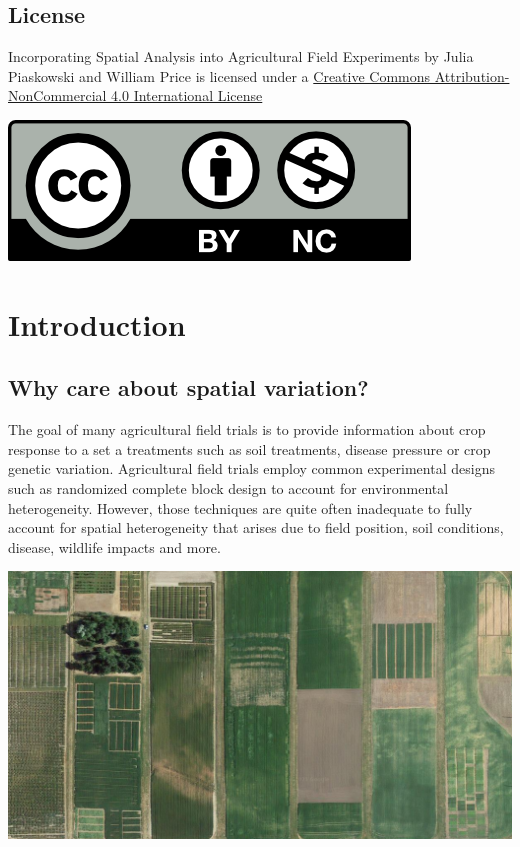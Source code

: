 \documentclass[
]{book}
\begin{document}
\hypertarget{license}{%
\section{License}\label{license}}

Incorporating Spatial Analysis into Agricultural Field Experiments by Julia Piaskowski and William Price is licensed under a \href{https://creativecommons.org/licenses/by-nc/4.0/}{Creative Commons Attribution-NonCommercial 4.0 International License}

\begin{center}\includegraphics[width=0.2\linewidth]{img/CC-by-nc} \end{center}

\hypertarget{intro}{%
\chapter{Introduction}\label{intro}}

\hypertarget{why-care-about-spatial-variation}{%
\section{Why care about spatial variation?}\label{why-care-about-spatial-variation}}

The goal of many agricultural field trials is to provide information about crop response to a set a treatments such as soil treatments, disease pressure or crop genetic variation. Agricultural field trials employ common experimental designs such as randomized complete block design to account for environmental heterogeneity. However, those techniques are quite often inadequate to fully account for spatial heterogeneity that arises due to field position, soil conditions, disease, wildlife impacts and more.

\begin{center}\includegraphics[width=0.9\linewidth]{img/plant_sciences_farm} \end{center}
\end{document}
